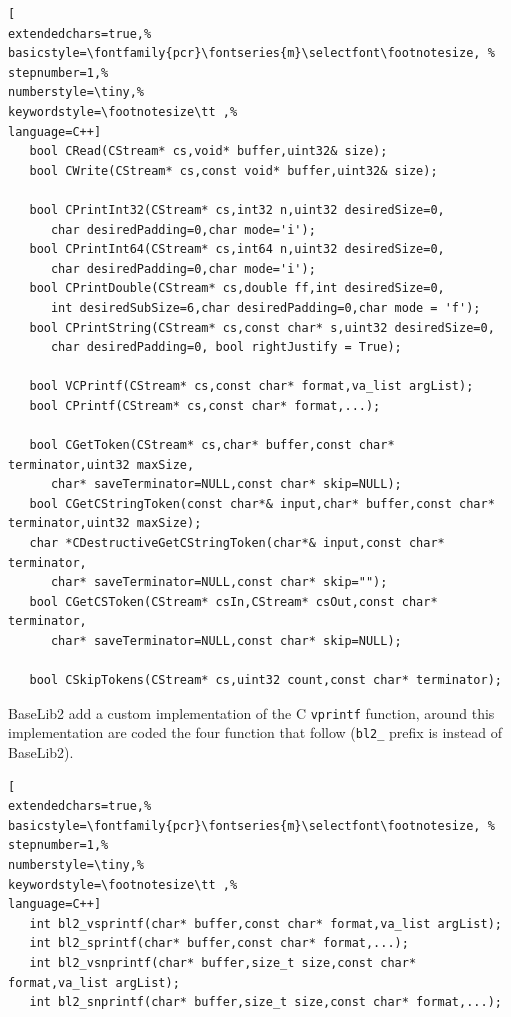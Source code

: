 \begin{lstlisting}[
extendedchars=true,%
basicstyle=\fontfamily{pcr}\fontseries{m}\selectfont\footnotesize, %
stepnumber=1,%
numberstyle=\tiny,%
keywordstyle=\footnotesize\tt ,%
language=C++]
   bool CRead(CStream* cs,void* buffer,uint32& size);
   bool CWrite(CStream* cs,const void* buffer,uint32& size);

   bool CPrintInt32(CStream* cs,int32 n,uint32 desiredSize=0,
      char desiredPadding=0,char mode='i');
   bool CPrintInt64(CStream* cs,int64 n,uint32 desiredSize=0,
      char desiredPadding=0,char mode='i');
   bool CPrintDouble(CStream* cs,double ff,int desiredSize=0,
      int desiredSubSize=6,char desiredPadding=0,char mode = 'f');
   bool CPrintString(CStream* cs,const char* s,uint32 desiredSize=0,
      char desiredPadding=0, bool rightJustify = True);

   bool VCPrintf(CStream* cs,const char* format,va_list argList);
   bool CPrintf(CStream* cs,const char* format,...);

   bool CGetToken(CStream* cs,char* buffer,const char* terminator,uint32 maxSize,
      char* saveTerminator=NULL,const char* skip=NULL);
   bool CGetCStringToken(const char*& input,char* buffer,const char* terminator,uint32 maxSize);
   char *CDestructiveGetCStringToken(char*& input,const char* terminator,
      char* saveTerminator=NULL,const char* skip="");
   bool CGetCSToken(CStream* csIn,CStream* csOut,const char* terminator,
      char* saveTerminator=NULL,const char* skip=NULL);

   bool CSkipTokens(CStream* cs,uint32 count,const char* terminator);
\end{lstlisting}

BaseLib2 add a custom implementation of the C \texttt{vprintf} function, around this implementation are coded the four function that follow (\texttt{bl2\_} prefix is instead of BaseLib2).

\begin{lstlisting}[
extendedchars=true,%
basicstyle=\fontfamily{pcr}\fontseries{m}\selectfont\footnotesize, %
stepnumber=1,%
numberstyle=\tiny,%
keywordstyle=\footnotesize\tt ,%
language=C++]
   int bl2_vsprintf(char* buffer,const char* format,va_list argList);
   int bl2_sprintf(char* buffer,const char* format,...);
   int bl2_vsnprintf(char* buffer,size_t size,const char* format,va_list argList);
   int bl2_snprintf(char* buffer,size_t size,const char* format,...);
\end{lstlisting}



